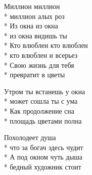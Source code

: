 \begin{minipage}{\linewidth}
\hspace*{1.5em}Миллион миллион\\*
\hspace*{1.5em}миллион алых роз\\*
\hspace*{1.5em}Из окна из окна\\*
\hspace*{1.5em}из окна видишь ты\\*
\hspace*{1.5em}Кто влюблен кто влюблен\\*
\hspace*{1.5em}кто влюблен и всерьез\\*
\hspace*{1.5em}Свою жизнь для тебя\\*
\hspace*{1.5em}превратит в цветы\\
\end{minipage}\par\medskip\nobreak

\medskip

\begin{minipage}{\linewidth}
Утром ты встанешь у окна\\*
может сошла ты с ума\\*
Как продолжение сна\\*
площадь цветами полна\\
\end{minipage}\par\medskip\nobreak

\medskip

\begin{minipage}{\linewidth}
Похолодеет душа\\*
что за богач здесь чудит\\*
А под окном чуть дыша\\*
бедный художник стоит\\
\end{minipage}\par\medskip\nobreak

\medskip

